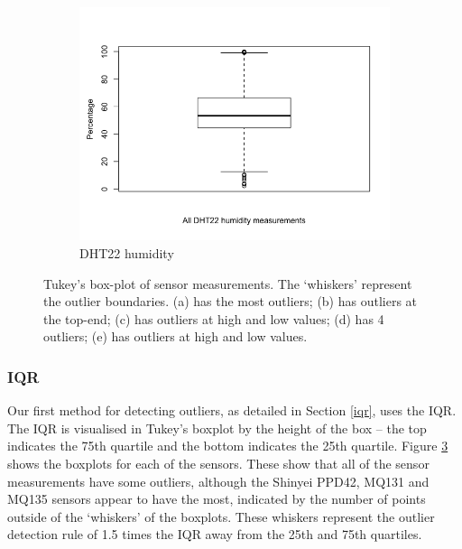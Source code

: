 \documentclass[11pt]{report}
\begin{document}
\begin{figure}[!tb]
\begin{minipage}{1\linewidth}
\begin{subfigure}[t]{.5\linewidth}
            	\label{fig:temp_boxplot}
	   \end{subfigure}
        \end{minipage}
    \begin{minipage}{1\linewidth}
    	\centering
        \begin{subfigure}[t]{.5\linewidth}
            \includegraphics[width=\textwidth]{images/humidity_boxplot}
            \caption{DHT22 humidity}
            \label{fig:humidity_boxplot}
        \end{subfigure}
    \end{minipage}
    \caption{Tukey's box-plot of sensor measurements. The `whiskers' represent the outlier boundaries. (a) has the most outliers; (b) has outliers at the top-end; (c) has outliers at high and low values; (d) has 4 outliers; (e) has outliers at high and low values.}
    \label{tukey_boxplots}
\end{figure}


\subsubsection{IQR}

Our first method for detecting outliers, as detailed in Section \ref{iqr}, uses the IQR. The IQR is visualised in Tukey's boxplot by the height of the box -- the top indicates the 75th quartile and the bottom indicates the 25th quartile. Figure \ref{tukey_boxplots} shows the boxplots for each of the sensors. These show that all of the sensor measurements have some outliers, although the Shinyei PPD42, MQ131 and MQ135 sensors appear to have the most, indicated by the number of points outside of the `whiskers' of the boxplots. These whiskers represent the outlier detection rule of 1.5 times the IQR away from the 25th and 75th quartiles.
\end{document}
